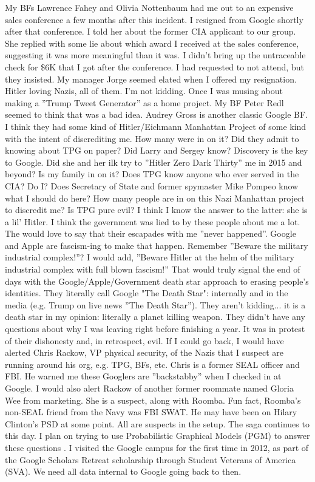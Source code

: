 \documentclass{article}
\begin{document}
\begin{multicols}{2}
My BFs Lawrence Fahey and Olivia Nottenbaum had me out to an expensive sales conference a few months after this incident. I resigned from Google shortly after that conference. I told her about the former CIA applicant to our group. She replied with some lie about which award I received at the sales conference, suggesting it was more meaningful than it was. I didn't bring up the untraceable check for \$6K that I got after the conference. I had requested to not attend, but they insisted. My manager Jorge seemed elated when I offered my resignation. Hitler loving Nazis, all of them. I'm not kidding. Once I was musing about making a ''Trump Tweet Generator'' as a home project. My BF Peter Redl seemed to think that was a bad idea. Audrey Gross is another classic Google BF. I think they had some kind of Hitler/Eichmann Manhattan Project of some kind with the intent of discrediting me. How many were in on it? Did they admit to knowing about TPG on paper? Did Larry and Sergey know? Discovery is the key to Google. Did she and her ilk try to ''Hitler Zero Dark Thirty'' me in 2015 and beyond? Is my family in on it? Does TPG know anyone who ever served in the CIA? Do I? Does Secretary of State and former spymaster Mike Pompeo know what I should do here? How many people are in on this Nazi Manhattan project to discredit me? Is TPG pure evil? I think I know the answer to the latter: she is a lil' Hitler. I think the government was lied to by these people about me a lot. The would love to say that their escapades with me ''never happened''. Google and Apple are fascism-ing to make that happen. Remember ''Beware the military industrial complex!''? I would add, ''Beware Hitler at the helm of the military industrial complex with full blown fascism!'' That would truly signal the end of days with the Google/Apple/Government death star approach to erasing people's identities. They literally call Google "The Death Star": internally and in the media (e.g. Trump on live news ''The Death Star''). They aren't kidding... it is a death star in my opinion: literally a planet killing weapon. They didn't have any questions about why I was leaving right before finishing a year. It was in protest of their dishonesty and, in retrospect, evil. If I could go back, I would have alerted Chris Rackow, VP physical security, of the Nazis that I suspect are running around his org, e.g. TPG, BFs, etc. Chris is a former SEAL officer and FBI. He warned me these Googlers are ''backstabby'' when I checked in at Google. I would also alert Rackow of another former roommate named Gloria Wee from marketing. She is a suspect, along with Roomba. Fun fact, Roomba's non-SEAL friend from the Navy was FBI SWAT. He may have been on Hilary Clinton's PSD at some point. All are suspects in the setup. The saga continues to this day. I plan on trying to use Probabilistic Graphical Models (PGM) to answer these questions \cite{probabilisticgraphicalmodels}. I visited the Google campus for the first time in 2012, as part of the Google Scholars Retreat scholarship through Student Veterans of America (SVA). We need all data internal to Google going back to then.


\end{multicols}
\end{document}
